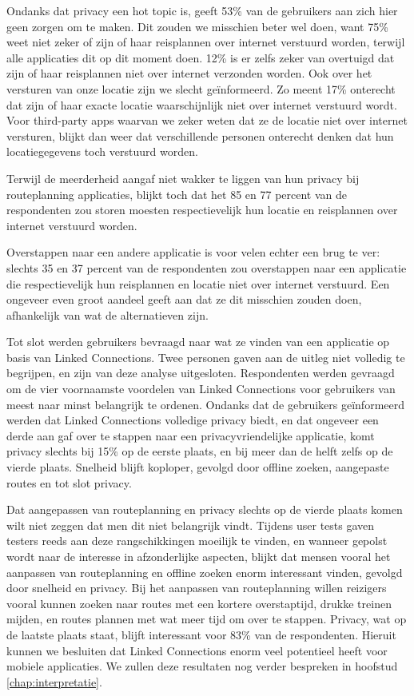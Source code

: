 Ondanks dat privacy een hot topic is, geeft 53\% van de gebruikers aan zich hier geen zorgen om te maken. Dit zouden we misschien beter wel doen, want 75\% weet niet zeker of zijn of haar reisplannen over internet verstuurd worden, terwijl alle applicaties dit op dit moment doen. 12\% is er zelfs zeker van overtuigd dat zijn of haar reisplannen niet over internet verzonden worden. Ook over het versturen van onze locatie zijn we slecht geïnformeerd. Zo meent 17\% onterecht dat zijn of haar exacte locatie waarschijnlijk niet over internet verstuurd wordt. Voor third-party apps waarvan we zeker weten dat ze de locatie niet over internet versturen, blijkt dan weer dat verschillende personen onterecht denken dat hun locatiegegevens toch verstuurd worden. 

Terwijl de meerderheid aangaf niet wakker te liggen van hun privacy bij routeplanning applicaties, blijkt toch dat het 85 en 77 percent van de respondenten zou storen moesten respectievelijk hun locatie en reisplannen over internet verstuurd worden.
 
Overstappen naar een andere applicatie is voor velen echter een brug te ver: slechts 35 en 37 percent van de respondenten zou overstappen naar een applicatie die respectievelijk hun reisplannen en locatie niet over internet verstuurd. Een ongeveer even groot aandeel geeft aan dat ze dit misschien zouden doen, afhankelijk van wat de alternatieven zijn.

Tot slot werden gebruikers bevraagd naar wat ze vinden van een applicatie op basis van Linked Connections. Twee personen gaven aan de uitleg niet volledig te begrijpen, en zijn van deze analyse uitgesloten.
Respondenten werden gevraagd om de vier voornaamste voordelen van Linked Connections voor gebruikers van meest naar minst belangrijk te ordenen. Ondanks dat de gebruikers geïnformeerd werden dat Linked Connections volledige privacy biedt, en dat ongeveer een derde aan gaf over te stappen naar een privacyvriendelijke applicatie, komt privacy slechts bij 15\% op de eerste plaats, en bij meer dan de helft zelfs op de vierde plaats. Snelheid blijft koploper, gevolgd door offline zoeken, aangepaste routes en tot slot privacy.

Dat aangepassen van routeplanning en privacy slechts op de vierde plaats komen wilt niet zeggen dat men dit niet belangrijk vindt. Tijdens user tests gaven testers reeds aan deze rangschikkingen moeilijk te vinden, en wanneer gepolst wordt naar de interesse in afzonderlijke aspecten, blijkt dat mensen vooral het aanpassen van routeplanning en offline zoeken enorm interessant vinden, gevolgd door snelheid en privacy. Bij het aanpassen van routeplanning willen reizigers vooral kunnen zoeken naar routes met een kortere overstaptijd, drukke treinen mijden, en routes plannen met wat meer tijd om over te stappen. Privacy, wat op de laatste plaats staat, blijft interessant voor 83\% van de respondenten. Hieruit kunnen we besluiten dat Linked Connections enorm veel potentieel heeft voor mobiele applicaties. We zullen deze resultaten nog verder bespreken in hoofstud \ref{chap:interpretatie}.

